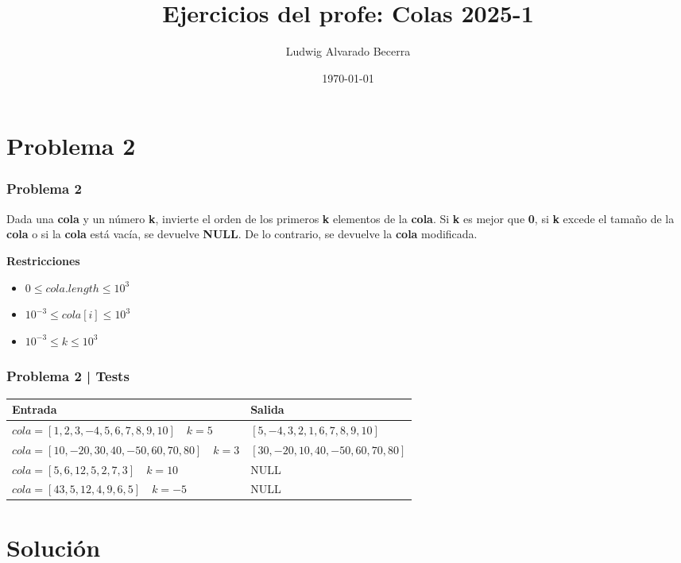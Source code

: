 \documentclass[17pt, t, lualatex]{beamer}
\title{\LARGE Ejercicios del profe: Colas 2025-1}
\date{\today}
\institute[UJTL]{Universidad Jorge Tadeo Lozano - Semillero de Programación Competitiva}
\author{Ludwig Alvarado Becerra}
\begin{document}
\inserttitlepage

\section{Problema 2}

\insertsectionpage


\begin{frame}
  \frametitle{Problema 2}

  Dada una \textbf{cola} y un número \textbf{k}, invierte el orden de los primeros \textbf{k} elementos de la \textbf{cola}. Si \textbf{k} es mejor que \textbf{0}, si \textbf{k} excede el tamaño de la \textbf{cola} o si la \textbf{cola} está vacía, se devuelve \textbf{NULL}. De lo contrario, se devuelve la \textbf{cola} modificada.

  \textbf{Restricciones}

  \begin{itemize}
    \item $0 \leq cola.length \leq 10^{3}$
    \item $10^{-3} \leq cola[i] \leq 10^{3}$
    \item $10^{-3} \leq k \leq 10^{3}$
  \end{itemize}

\end{frame}

\begin{frame}
  \frametitle{Problema 2 | Tests}

  \begin{table}[h]
  \centering
  \begin{tabular}{|>{\centering\arraybackslash}p{}|>{\centering\arraybackslash}p{}|}
    \hline
    \textbf{Entrada} & \textbf{Salida} \\ \hline
    $cola = [1, 2, 3, -4, 5, 6, 7, 8, 9, 10] \quad k = 5$ & $[5, -4, 3, 2, 1, 6, 7, 8, 9, 10]$ \\ \hline
    $cola = [10, -20, 30, 40, -50, 60, 70, 80] \quad k = 3$ & $[30, -20, 10, 40, -50, 60, 70, 80]$ \\ \hline
    $cola = [5, 6, 12, 5, 2, 7, 3] \quad k = 10$ & NULL \\ \hline
    $cola = [43, 5, 12, 4, 9, 6, 5] \quad k = -5$ & NULL \\ \hline
  \end{tabular}
\end{table}

\end{frame}

\section{Solución}
\end{document}
